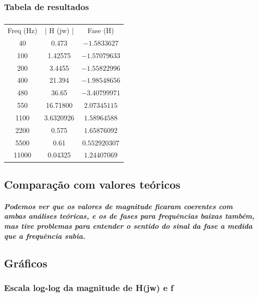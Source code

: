 \documentclass[12pt,twoside, a4paper, twocolumn]{article}
\begin{document}
\subsubsection{Tabela de resultados}


\subparagraph*{}


\begin{center}
    \begin{tabular}{ |c|c|c| }
        \hline
        Freq (Hz) & | H (jw) | & Fase (H)      \\
        40        & 0.473      & $-1.5833627$  \\
        100       & 1.42575    & $-1.57079633$ \\
        200       & 3.4455     & $-1.55822996$ \\
        400       & 21.394     & $-1.98548656$ \\
        480       & 36.65      & $-3.40799971$ \\
        550       & 16.71800   & $2.07345115$  \\
        1100      & 3.6320926  & $ 1.58964588$ \\
        2200      & 0.575      & $1.65876092$  \\
        5500      & 0.61       & $0.552920307$ \\
        11000     & 0.04325    & $1.24407069$  \\
        \hline
    \end{tabular}
\end{center}


\subsection{Comparação com valores teóricos}


\subparagraph*{Podemos ver que os valores de magnitude ficaram coerentes com ambas análises teóricas, e os de fases para frequências baixas também, mas tive problemas para entender o sentido do sinal da fase a medida que a frequência subia.}


\subsection{Gráficos}


\subsubsection{Escala log-log da magnitude de H(jw) e f}
\end{document}
